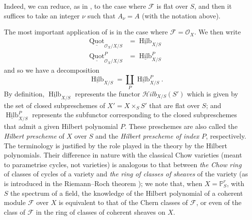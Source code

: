 \begin{cproof}
  Indeed, we can reduce, as in , to the case where $\mathcal{F}$ is flat over $S$, and then it suffices to take an integer $\nu$ such that $A_\nu=A$ (with the notation above).
\end{cproof}

The most important application of  is in the case where $\mathcal{F}=\mathcal{O}_X$.
We then write
\[
  \begin{aligned}
    \underline{\operatorname{Quot}}_{\mathcal{O}_X/X/S}
     & = \underline{\operatorname{Hilb}}_{X/S}
    \\\underline{\operatorname{Quot}}_{\mathcal{O}_X/X/S}^P
     & = \underline{\operatorname{Hilb}}_{X/S}^P
  \end{aligned}
\]
and so we have a decomposition
\[
  \underline{\operatorname{Hilb}}_{X/S}
  = \coprod_P \underline{\operatorname{Hilb}}_{X/S}^P.
\]
By definition, $\underline{\operatorname{Hilb}}_{X/S}$ represents the functor $\mathcal{H}ilb_{X/S} (S')$ which is given by the set of closed subpreschemes of $X'=X\times_S S'$ that are flat over $S$;
and $\underline{\operatorname{Hilb}}_{X/S}^P$ represents the subfunctor corresponding to the closed subpreschemes that admit a given Hilbert polynomial $P$.
These preschemes are also called the \emph{Hilbert prescheme} of $X$ over $S$ and the \emph{Hilbert prescheme of index $P$}, respectively.
The terminology is justified by the role played in the theory by the Hilbert polynomials.
Their difference in nature with the classical Chow varieties (meant to parametrise cycles, not varieties) is analogous to that between \emph{the Chow ring} of classes of cycles of a variety and \emph{the ring of classes of sheaves} of the variety (as is introduced in the Riemann–Roch theorem \cite{BS1958});
we note that, when $X=\mathbb{P}_S^r$, with $S$ the spectrum of a field, the knowledge of the Hilbert polynomial of a coherent module $\mathcal{F}$ over $X$ is equivalent to that of the Chern classes of $\mathcal{F}$, or even of the class of $\mathcal{F}$ in the ring of classes of coherent sheaves on $X$.


